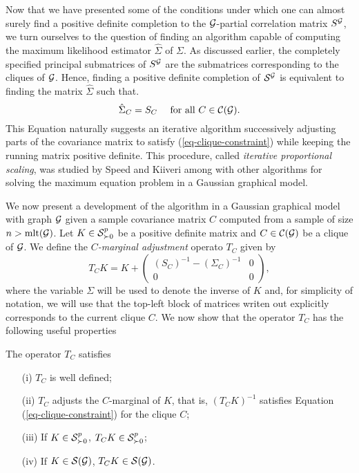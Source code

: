 Now that we have presented some of the conditions under which one can almost surely find a positive definite completion to the $\G$-partial correlation matrix $S^\G$, we turn ourselves to the question of finding an algorithm capable of computing the maximum likelihood estimator $\hat\Sigma$ of $\Sigma$. As discussed earlier, the completely specified principal submatrices of $S^\G$ are the submatrices corresponding to the cliques of $\G$. Hence, finding a positive definite completion of $\S^\G$ is equivalent to finding the matrix $\hat\Sigma$ such that.
\begin{equation} \label{eq-clique-constraint}
    \hat\Sigma_C = S_C \ \ \ \ \t{for all } C \in \c{C}(\G).
\end{equation}
This Equation naturally suggests an iterative algorithm successively adjusting parts of the covariance matrix to satisfy (\ref{eq-clique-constraint}) while keeping the running matrix positive definite. This procedure, called \textit{iterative proportional scaling}, was studied by Speed and Kiiveri \cite{speed1986gaussian} among with other algorithms for solving the maximum equation problem in a Gaussian graphical model. 

We now present a development of the algorithm in a Gaussian graphical model with graph $\G$ given a sample covariance matrix $C$ computed from a sample of size $n > \t{mlt}(\G)$. Let $K \in \S^p_{\succ 0}$ be a positive definite matrix and $C \in \c{C}(\G)$ be a clique of $\G$. We define the \textit{$C$-marginal adjustment} operato $T_C$ given by
\begin{equation} \label{eq-tc-1}
    T_C K = K + \begin{pmatrix}
        (S_C)^{-1} - (\Sigma_C)^{-1} & 0\\
        0 & 0 
        \end{pmatrix},
\end{equation}
where the variable $\Sigma$ will be used to denote the inverse of $K$ and, for simplicity of notation, we will use that the top-left block of matrices writen out explicitly corresponds to the current clique $C$. We now show that the operator $T_C$ has the following useful properties 

\begin{proposition}
    The operator $T_C$ satisfies
    \begin{itemize}
        \item[(i)] $T_C$ is well defined;
        \item[(ii)] $T_C$ adjusts the $C$-marginal of $K$, that is, $(T_C K)^{-1}$ satisfies Equation (\ref{eq-clique-constraint}) for the clique $C$;
        \item[(iii)] If $K \in \S^p_{\succ 0}$, $T_C K \in \S^p_{\succ 0}$;
        \item[(iv)] If $K \in \S(\G)$, $T_C K \in \S(\G)$.
    \end{itemize}    
\end{proposition}

